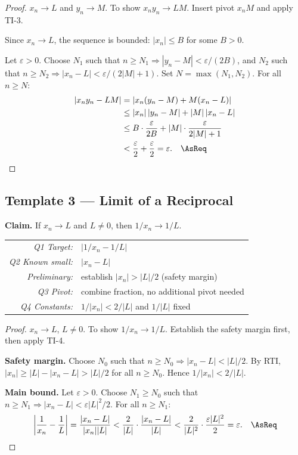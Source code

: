 \begin{proof}
\Given $x_n \to L$ and $y_n \to M$.
\Goal To show $x_n y_n \to LM$.
\Strategy Insert pivot $x_n M$ and apply TI-3.

Since $x_n \to L$, the sequence is bounded: $|x_n| \le B$ for some $B > 0$.

Let $\varepsilon > 0$.
Choose $N_1$ such that $n \ge N_1 \Rightarrow |y_n - M| < \varepsilon/(2B)$,
and $N_2$ such that $n \ge N_2 \Rightarrow |x_n - L| < \varepsilon/(2|M|+1)$.
Set $N = \max(N_1, N_2)$.
For all $n \ge N$:
\begin{align*}
  |x_n y_n - LM|
  &= |x_n(y_n - M) + M(x_n - L)| \\
  &\le |x_n|\,|y_n - M| + |M|\,|x_n - L| \\
  &\le B \cdot \frac{\varepsilon}{2B} + |M| \cdot \frac{\varepsilon}{2|M|+1} \\
  &< \frac{\varepsilon}{2} + \frac{\varepsilon}{2} = \varepsilon. \quad\AsReq
\end{align*}
\end{proof}

\subsection{Template 3 — Limit of a Reciprocal}

\textbf{Claim.} If $x_n \to L$ and $L \ne 0$, then $1/x_n \to 1/L$.

\begin{center}
\renewcommand{\arraystretch}{1.3}
\begin{tabular}{r l}
\toprule
\textit{Q1 Target:} & $|1/x_n - 1/L|$ \\
\textit{Q2 Known small:} & $|x_n - L|$ \\
\textit{Preliminary:} & establish $|x_n| > |L|/2$ (safety margin) \\
\textit{Q3 Pivot:} & combine fraction, no additional pivot needed \\
\textit{Q4 Constants:} & $1/|x_n| < 2/|L|$ and $1/|L|$ fixed \\
\bottomrule
\end{tabular}
\end{center}

\begin{proof}
\Given $x_n \to L$, $L \ne 0$.
\Goal To show $1/x_n \to 1/L$.
\Strategy Establish the safety margin first, then apply TI-4.

\textbf{Safety margin.}
Choose $N_0$ such that $n \ge N_0 \Rightarrow |x_n - L| < |L|/2$.
By RTI, $|x_n| \ge |L| - |x_n - L| > |L|/2$ for all $n \ge N_0$.
Hence $1/|x_n| < 2/|L|$.

\textbf{Main bound.}
Let $\varepsilon > 0$.
Choose $N_1 \ge N_0$ such that $n \ge N_1 \Rightarrow
|x_n - L| < \varepsilon |L|^2 / 2$.
For all $n \ge N_1$:
\[
  \left|\frac{1}{x_n} - \frac{1}{L}\right|
  = \frac{|x_n - L|}{|x_n||L|}
  < \frac{2}{|L|} \cdot \frac{|x_n - L|}{|L|}
  < \frac{2}{|L|^2} \cdot \frac{\varepsilon |L|^2}{2}
  = \varepsilon. \quad\AsReq
\]
\end{proof}


